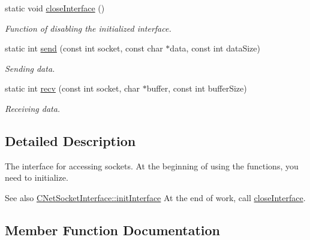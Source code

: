 \begin{DoxyCompactItemize}
static void \mbox{\hyperlink{class_net_1_1_c_net_socket_interface_a8d07a643a30977a250d611653d05e7d2}{close\+Interface}} ()
\begin{DoxyCompactList}\small\item\em Function of disabling the initialized interface. \end{DoxyCompactList}\item 
static int \mbox{\hyperlink{class_net_1_1_c_net_socket_interface_ad6a594a3ebe2fd855399aabfcbe0f95e}{send}} (const int socket, const char $\ast$data, const int data\+Size)
\begin{DoxyCompactList}\small\item\em Sending data. \end{DoxyCompactList}\item 
static int \mbox{\hyperlink{class_net_1_1_c_net_socket_interface_a66531da7c243f12948bd79293d6299e2}{recv}} (const int socket, char $\ast$buffer, const int buffer\+Size)
\begin{DoxyCompactList}\small\item\em Receiving data. \end{DoxyCompactList}\end{DoxyCompactItemize}


\subsection{Detailed Description}
The interface for accessing sockets. At the beginning of using the functions, you need to initialize. 

\begin{DoxySeeAlso}{See also}
\mbox{\hyperlink{class_net_1_1_c_net_socket_interface_a3f0603a3708ca966b9f37d9202761aa8}{C\+Net\+Socket\+Interface\+::init\+Interface}} At the end of work, call \mbox{\hyperlink{class_net_1_1_c_net_socket_interface_a8d07a643a30977a250d611653d05e7d2}{close\+Interface}}. 
\end{DoxySeeAlso}


\subsection{Member Function Documentation}
\mbox{\label{class_net_1_1_c_net_socket_interface_a4fceb3945002b0aa62dbc7af4afac76d}} 
